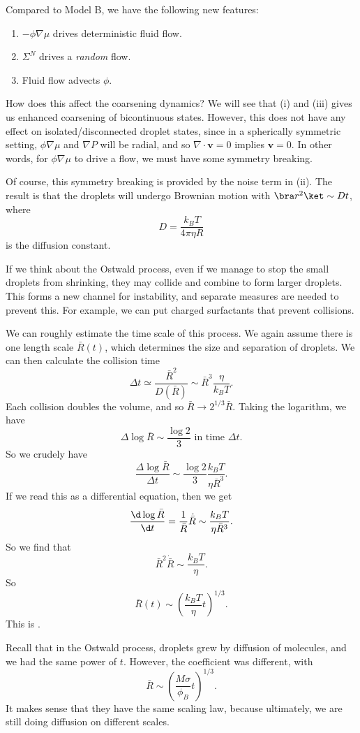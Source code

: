 \documentclass[a4paper]{article}
\begin{document}
Compared to Model B, we have the following new features:
\begin{enumerate}
  \item $-\phi\nabla \mu$ drives deterministic fluid flow.
  \item $\Sigma^N$ drives a \emph{random} flow.
  \item Fluid flow advects $\phi$.
\end{enumerate}
How does this affect the coarsening dynamics? We will see that (i) and (iii) gives us enhanced coarsening of bicontinuous states. However, this does not have any effect on isolated/disconnected droplet states, since in a spherically symmetric setting, $\phi \nabla \mu$ and $\nabla P$ will be radial, and so $\nabla \cdot \mathbf{v} = 0$ implies $\mathbf{v} = 0$. In other words, for $\phi \nabla \mu$ to drive a flow, we must have some symmetry breaking.

Of course, this symmetry breaking is provided by the noise term in (ii). The result is that the droplets will undergo Brownian motion with $\bra r^2\ket \sim Dt$, where
\[
  D = \frac{k_B T}{4\pi \eta R}
\]
is the diffusion constant.

If we think about the Ostwald process, even if we manage to stop the small droplets from shrinking, they may collide and combine to form larger droplets. This forms a new channel for instability, and separate measures are needed to prevent this. For example, we can put charged surfactants that prevent collisions.

We can roughly estimate the time scale of this process. We again assume there is one length scale $\bar{R}(t)$, which determines the size and separation of droplets. We can then calculate the collision time
\[
  \Delta t \simeq \frac{\bar{R}^2}{D(\bar{R})} \sim \bar{R}^3 \frac{\eta}{k_B T}.
\]
Each collision doubles the volume, and so $\bar{R} \to 2^{1/3} \bar{R}$. Taking the logarithm, we have
\[
  \Delta \log \bar{R} \sim \frac{\log 2}{3}\text{ in time }\Delta t.
\]
So we crudely have
\[
  \frac{\Delta \log \bar{R}}{\Delta t} \sim \frac{\log 2}{3} \frac{k_B T}{\eta \bar{R}^3}.
\]
If we read this as a differential equation, then we get
\[
  \frac{\d \log \bar{R}}{\d t} = \frac{1}{\bar{R}} \dot{\bar{R}} \sim \frac{k_B T}{\eta \bar{R}^3}.
\]
So we find that
\[
  \bar{R}^2 \dot{\bar{R}} \sim \frac{k_B T}{\eta}.
\]
So
\[
  \bar{R}(t) \sim \left(\frac{k_B T}{\eta} t\right)^{1/3}.
\]
This is .

Recall that in the Ostwald process, droplets grew by diffusion of molecules, and we had the same power of $t$. However, the coefficient was different, with
\[
  \bar{R} \sim \left(\frac{M \sigma}{\phi_B} t\right)^{1/3}.
\]
It makes sense that they have the same scaling law, because ultimately, we are still doing diffusion on different scales.
\end{document}
